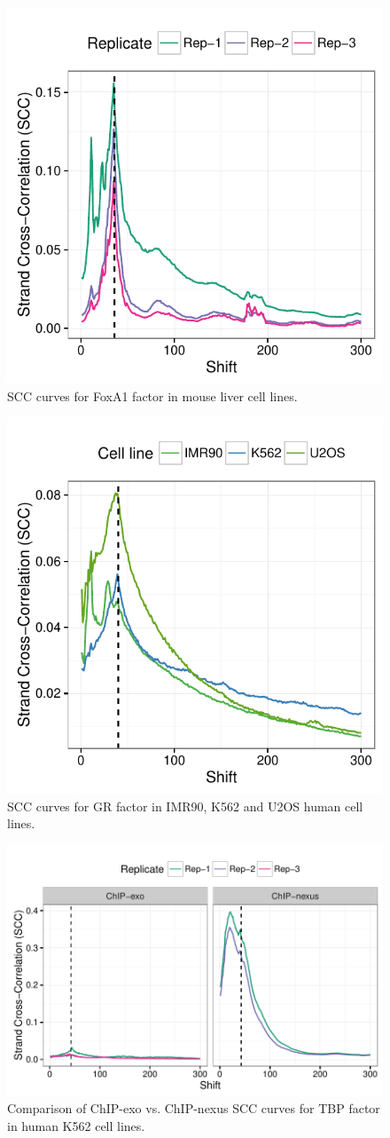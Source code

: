 \documentclass{article}
\begin{document}
\begin{figure}[H]
  \centering
  \includegraphics[width =
  .5\textwidth]{figures/supplement/SCC/Carroll_mouse_SCC.pdf}
  \caption{SCC curves for FoxA1 factor in mouse liver cell lines.}
\label{sfig:scc2}
\end{figure}

\begin{figure}[H]
  \centering
  \includegraphics[width =
  .5\textwidth]{figures/supplement/SCC/Meijsing_GR_SCC.pdf}
  \caption{SCC curves for GR factor in IMR90, K562 and U2OS human cell
    lines.}
  \label{sfig:scc3}
\end{figure}

\begin{figure}[H]
  \centering
  \includegraphics[width =
  .75\textwidth]{figures/supplement/SCC/TBP_K562_SCC.pdf}
  \caption{Comparison of ChIP-exo vs. ChIP-nexus SCC curves for TBP
    factor in human K562 cell lines.}
  \label{sfig:scc4}
\end{figure}
\end{document}
